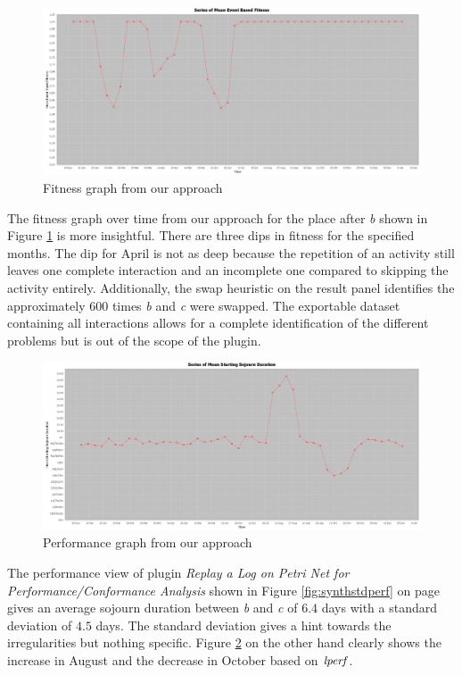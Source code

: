\begin{figure} [H]
    \centering
    \includegraphics[width=\textwidth]{figures/evaluation/synth_conf.png}
    \caption{Fitness graph from our approach}
    \label{fig:synthconf}
\end{figure}

The fitness graph over time from our approach for the place after \emph{b} shown in Figure \ref{fig:synthconf} is more insightful. There are three dips in fitness for the specified months. The dip for April is not as deep because the repetition of an activity still leaves one complete interaction and an incomplete one compared to skipping the activity entirely.
Additionally, the swap heuristic on the result panel identifies the approximately $600$ times \emph{b} and \emph{c} were swapped.
The exportable dataset containing all interactions allows for a complete identification of the different problems but is out of the scope of the plugin.

\begin{figure}[H]
    \centering
    \includegraphics[width=\textwidth]{figures/evaluation/synth_perf.png}
    \caption{Performance graph from our approach}
    \label{fig:synthperf}
\end{figure}

The performance view of plugin \emph{Replay a Log on Petri Net for Performance/Conformance Analysis} shown in Figure \ref{fig:synthstdperf} on page  gives an average sojourn duration between \emph{b} and \emph{c} of $6.4$ days with a standard deviation of $4.5$ days. The standard deviation gives a hint towards the irregularities but nothing specific.
Figure \ref{fig:synthperf} on the other hand clearly shows the increase in August and the decrease in October based on $\mathit{lperf}$.

